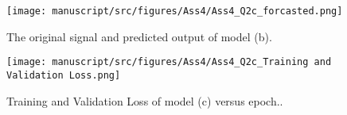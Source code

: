 \begin{figure}[H]
    \centering
    \begin{minipage}[b]{1\textwidth}
        \texttt{[image: manuscript/src/figures/Ass4/Ass4\_Q2c\_forcasted.png]}
    \end{minipage}
    \caption{The original signal and predicted output of model (b).}
    \label{fig:Ass4_Q2c_forcasted}
\end{figure}






\begin{figure}[H]
    \centering
    \begin{minipage}[b]{1\textwidth}
        \texttt{[image: manuscript/src/figures/Ass4/Ass4\_Q2c\_Training and Validation Loss.png]}
    \end{minipage}
    \caption{Training and Validation Loss of model (c) versus epoch..}
    \label{fig:Ass4_Q2c_Training}
\end{figure}












